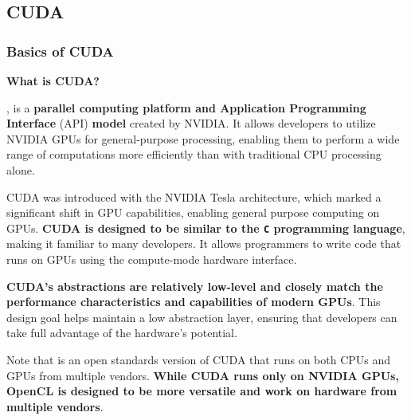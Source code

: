 \subsection{CUDA}

\subsubsection{Basics of CUDA}\label{subsubsection: Basics of CUDA}

\begin{flushleft}
    \textcolor{Green3}{ \textbf{What is CUDA?}}
\end{flushleft}
, is a \textbf{parallel computing platform and Application Programming Interface} (API) \textbf{model} created by NVIDIA. It allows developers to utilize NVIDIA GPUs for general-purpose processing, enabling them to perform a wide range of computations more efficiently than with traditional CPU processing alone.

\highspace
CUDA was introduced with the NVIDIA Tesla architecture, which marked a significant shift in GPU capabilities, enabling general purpose computing on GPUs. \textbf{CUDA is designed to be similar to the \texttt{C} programming language}, making it familiar to many developers. It allows programmers to write code that runs on GPUs using the compute-mode hardware interface.

\highspace
\textbf{CUDA's abstractions are relatively low-level and closely match the performance characteristics and capabilities of modern GPUs}. This design goal helps maintain a low abstraction layer, ensuring that developers can take full advantage of the hardware's potential.

\highspace
Note that  is an open standards version of CUDA that runs on both CPUs and GPUs from multiple vendors. \textbf{While CUDA runs only on NVIDIA GPUs, OpenCL is designed to be more versatile and work on hardware from multiple vendors}.


